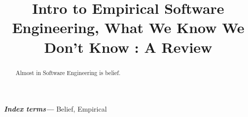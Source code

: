 \documentclass[conference, compsoc, twoside]{IEEEtran}
\begin{document}
\preto\tabular{\setcounter{magicrownumbers}{0}}
\newcommand\rownumber{\stepcounter{magicrownumbers}\arabic{magicrownumbers}}
\title{\Huge Intro to Empirical Software Engineering, What We Know We Don't Know : A Review}
\author{
}

\maketitle
\providecommand{\keywords}[1]{\textbf{\textit{Index terms---}} #1}
\begin{abstract}
Almost in Software Engineering is belief.
\end{abstract}

\keywords{Belief, Empirical}
\IEEEpeerreviewmaketitle
\end{document}
